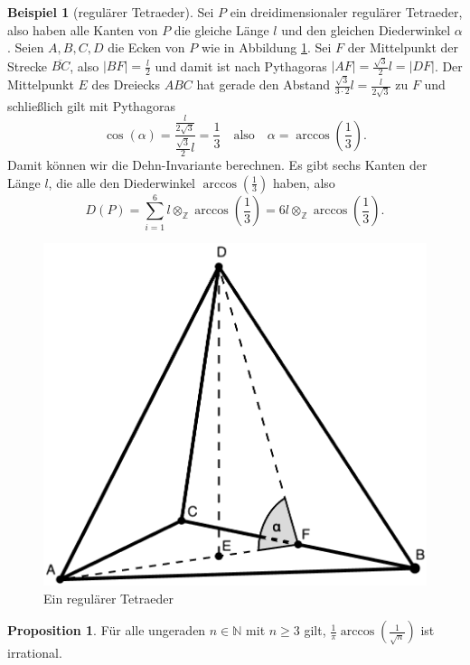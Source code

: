 \documentclass[11pt,titlepage]{article}
\newcommand{\setN}{\mathbb{N}}
\newcommand{\setZ}{\mathbb{Z}}
\theoremstyle{definition}
\newtheorem{proposition}[theorem]{Proposition}
\newtheorem{example}[theorem]{Beispiel}
\theoremstyle{remark}
\begin{document}
	\begin{example}[regulärer Tetraeder] \label{exp:regTetr}
		Sei $P$ ein dreidimensionaler regulärer Tetraeder, also haben alle Kanten von $P$ die gleiche Länge $l$ und 
		den gleichen Diederwinkel $\alpha$. Seien $A,B,C,D$ die Ecken von $P$ wie in Abbildung \ref{Abb.4}. 
		Sei $F$ der Mittelpunkt der Strecke $\overline{BC}$, also $|BF|=\frac{l}{2}$ und damit ist nach Pythagoras 
		$|AF|=\frac{\sqrt{3}}{2}l=|DF|$. Der Mittelpunkt $E$ des Dreiecks $ABC$ hat gerade den Abstand 
		$\frac{\sqrt{3}}{3 \cdot 2}l=\frac{l}{2\sqrt{3}}$ zu $F$ und schließlich gilt mit Pythagoras
		\[\cos(\alpha)=\frac{\frac{l}{2\sqrt{3}}}{\frac{\sqrt{3}}{2}l}=\frac{1}{3}\quad\text{also}
		\quad \alpha=\arccos\left(\frac{1}{3}\right). \]
		Damit können wir die Dehn-Invariante berechnen. Es gibt sechs Kanten der Länge $l$, die alle den 
		Diederwinkel $\arccos\left(\frac{1}{3}\right)$ haben, also
		\[ D(P)=\sum_{i=1}^6 l\otimes_{\setZ}\arccos\left(\frac{1}{3}\right)=6l\otimes_{\setZ}\arccos\left(\frac{1}{3}\right).\]
	\end{example}
	
	\begin{figure}[!htbp]
		\centering
		\includegraphics[scale=0.2]{RegulTetraeder}
		\caption{Ein regulärer Tetraeder}
		\label{Abb.4}
	\end{figure}
	
	\begin{proposition} \label{prop:irr}
		Für alle ungeraden $n\in\setN$ mit $n\geq 3$ gilt, $\frac{1}{\pi}\arccos\left(\frac{1}{\sqrt{n}}\right)$ ist irrational.
	\end{proposition}
	
\end{document}
